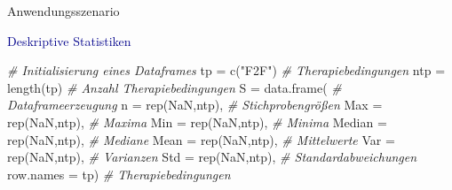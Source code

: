 \documentclass[
  8pt,
  ignorenonframetext,
]{beamer}
\newenvironment{Shaded}{\begin{snugshade}}{\end{snugshade}}
\newcommand{\AttributeTok}[1]{\textcolor[rgb]{0.77,0.63,0.00}{#1}}
\newcommand{\CommentTok}[1]{\textcolor[rgb]{0.56,0.35,0.01}{\textit{#1}}}
\newcommand{\ConstantTok}[1]{\textcolor[rgb]{0.00,0.00,0.00}{#1}}
\newcommand{\FunctionTok}[1]{\textcolor[rgb]{0.00,0.00,0.00}{#1}}
\newcommand{\NormalTok}[1]{#1}
\newcommand{\OtherTok}[1]{\textcolor[rgb]{0.56,0.35,0.01}{#1}}
\newcommand{\StringTok}[1]{\textcolor[rgb]{0.31,0.60,0.02}{#1}}
\begin{document}
\begin{frame}[fragile]{Anwendungsszenario}
\protect\hypertarget{anwendungsszenario-4}{}
\small

\textcolor{darkblue}{Deskriptive Statistiken} \vspace{3mm} \tiny
{}

\begin{Shaded}
\begin{Highlighting}[]
\CommentTok{\# Initialisierung eines Dataframes}
\NormalTok{tp            }\OtherTok{=} \FunctionTok{c}\NormalTok{(}\StringTok{"F2F"}\NormalTok{)                            }\CommentTok{\# Therapiebedingungen}
\NormalTok{ntp           }\OtherTok{=} \FunctionTok{length}\NormalTok{(tp)                          }\CommentTok{\# Anzahl Therapiebedingungen}
\NormalTok{S             }\OtherTok{=} \FunctionTok{data.frame}\NormalTok{(                         }\CommentTok{\# Dataframeerzeugung}
                \AttributeTok{n         =} \FunctionTok{rep}\NormalTok{(}\ConstantTok{NaN}\NormalTok{,ntp),           }\CommentTok{\# Stichprobengrößen}
                \AttributeTok{Max       =} \FunctionTok{rep}\NormalTok{(}\ConstantTok{NaN}\NormalTok{,ntp),           }\CommentTok{\# Maxima}
                \AttributeTok{Min       =} \FunctionTok{rep}\NormalTok{(}\ConstantTok{NaN}\NormalTok{,ntp),           }\CommentTok{\# Minima}
                \AttributeTok{Median    =} \FunctionTok{rep}\NormalTok{(}\ConstantTok{NaN}\NormalTok{,ntp),           }\CommentTok{\# Mediane}
                \AttributeTok{Mean      =} \FunctionTok{rep}\NormalTok{(}\ConstantTok{NaN}\NormalTok{,ntp),           }\CommentTok{\# Mittelwerte}
                \AttributeTok{Var       =} \FunctionTok{rep}\NormalTok{(}\ConstantTok{NaN}\NormalTok{,ntp),           }\CommentTok{\# Varianzen}
                \AttributeTok{Std       =} \FunctionTok{rep}\NormalTok{(}\ConstantTok{NaN}\NormalTok{,ntp),           }\CommentTok{\# Standardabweichungen}
                \AttributeTok{row.names =}\NormalTok{ tp)                     }\CommentTok{\# Therapiebedingungen}


\end{Highlighting}
\end{Shaded}
\end{frame}
\end{document}
